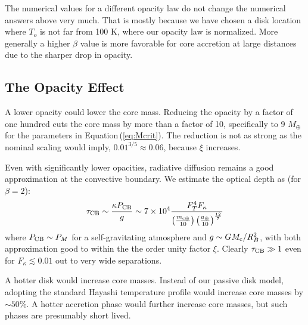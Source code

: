 \documentclass[12pt, preprint,numberedappendix]{emulateapj}
\newcommand{\Eq}[1]{Equation\,(\ref{#1})}
\newcommand{\co}{_{\rm c}}
\newcommand{\di}{_{\rm o}}
\newcommand{\cb}{_{\rm CB}}
\newcommand{\mc}{m_{\rm c \oplus}}
\newcommand{\au}{a_\oplus}
\begin{document}
The numerical values for a different opacity law do not change the numerical answers above very much.  That is mostly because we have chosen a disk location where $T_o$ is not far from 100 K, where our opacity law is normalized.  More generally a higher $\beta$ value is more favorable for core accretion at large distances due to the sharper drop in opacity.




\subsection{The Opacity Effect}
A  lower opacity  could lower the core mass.  Reducing the opacity by a factor of one hundred cuts the core mass by more than a factor of 10, specifically to 9 $M_\oplus$ for the parameters in \Eq{eq:Mcrit}.  The reduction is not  as strong as the nominal scaling would imply, $0.01^{3/5} \approx 0.06$, because $\xi$ increases.

Even with significantly lower opacities, radiative diffusion remains a good approximation at the convective boundary.  We estimate the optical depth as (for $\beta = 2$):
\begin{equation}
\tau\cb \sim {\kappa P\cb \over g} \sim 7 \times 10^4 {F_T^4 F_\kappa \over \left(\mc \over 10 \right) \left(\au \over 10\right)^{12 \over 7}} 
\end{equation} 
where $P\cb \sim P_M$ for a self-gravitating atmosphere and $g \sim G M\co/R_B^2$, with both approximation good to within the the order unity factor $\xi$.  Clearly $\tau\cb \gg 1$ even for $F_\kappa \lesssim 0.01$ out to very wide separations.

A hotter disk would increase core masses.  Instead of our passive disk model, adopting the standard Hayashi temperature profile would increase core masses by $\sim 50\%$.  A hotter accretion phase would further increase core masses, but such phases are presumably short lived.
\end{document}
